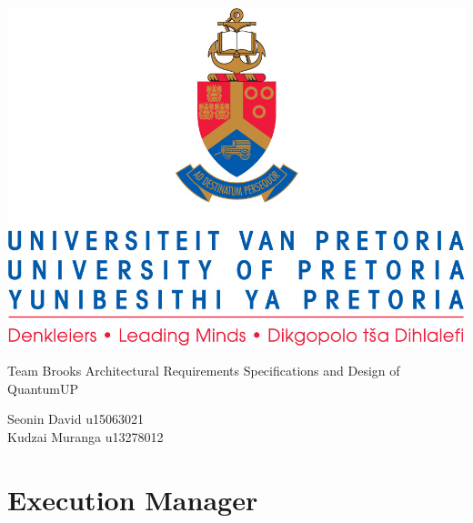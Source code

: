 \documentclass[]{article}
\begin{document}
\selectfont
	\begin{center}\thispagestyle{empty}
		\includegraphics{uplogo.jpg}
		
		{\Huge 
			Team Brooks \linebreak
			Architectural Requirements Specifications and Design of QuantumUP \linebreak 
			\par}
		 
        
        \begin{LARGE}
            Seonin David u15063021	\\
            Kudzai Muranga u13278012
            \linebreak
            \linebreak
         
            \linebreak
            \linebreak
         
            \linebreak
            \linebreak
       
            \linebreak
            \linebreak
           
        \end{LARGE}
    \end{center}
    
    \newpage
	\tableofcontents
	\newpage
	\clearpage
	
    \section{Execution Manager}
    
    \newpage
    
\end{document}
